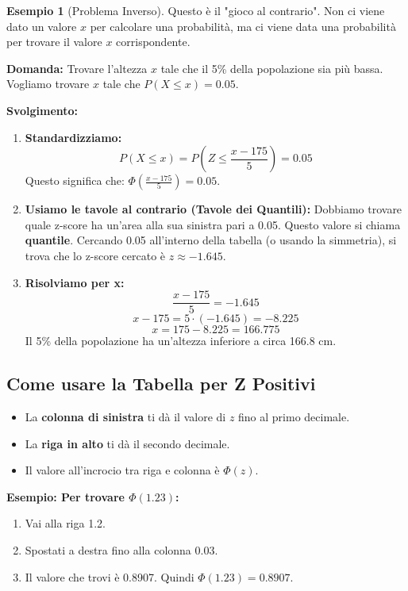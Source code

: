 \documentclass[a4paper, 11pt]{article}
\theoremstyle{definition}
\newtheorem{esempio}{Esempio}[section]
\begin{document}
\begin{esempio}[Problema Inverso]
Questo è il "gioco al contrario". Non ci viene dato un valore $x$ per calcolare una probabilità, ma ci viene data una probabilità per trovare il valore $x$ corrispondente.

\textbf{Domanda:} Trovare l'altezza $x$ tale che il 5\% della popolazione sia più bassa. Vogliamo trovare $x$ tale che $P(X \le x) = 0.05$.

\textbf{Svolgimento:}
\begin{enumerate}
    \item \textbf{Standardizziamo:}
    \[ P(X \le x) = P\left(Z \le \frac{x-175}{5}\right) = 0.05 \]
    Questo significa che: $\Phi\left(\frac{x-175}{5}\right) = 0.05$.

    \item \textbf{Usiamo le tavole al contrario (Tavole dei Quantili):}
    Dobbiamo trovare quale z-score ha un'area alla sua sinistra pari a 0.05. Questo valore si chiama \textbf{quantile}. Cercando 0.05 all'interno della tabella (o usando la simmetria), si trova che lo z-score cercato è $z \approx -1.645$.

    \item \textbf{Risolviamo per x:}
    \[ \frac{x-175}{5} = -1.645 \]
    \[ x - 175 = 5 \cdot (-1.645) = -8.225 \]
    \[ x = 175 - 8.225 = 166.775 \]
    Il 5\% della popolazione ha un'altezza inferiore a circa 166.8 cm.
\end{enumerate}
\end{esempio}

\newpage

\subsection*{Come usare la Tabella per Z Positivi}
\begin{itemize}
    \item La \textbf{colonna di sinistra} ti dà il valore di $z$ fino al primo decimale.
    \item La \textbf{riga in alto} ti dà il secondo decimale.
    \item Il valore all'incrocio tra riga e colonna è $\Phi(z)$.
\end{itemize}
\textbf{Esempio: Per trovare $\Phi(1.23)$:}
\begin{enumerate}
    \item Vai alla riga 1.2.
    \item Spostati a destra fino alla colonna 0.03.
    \item Il valore che trovi è 0.8907. Quindi $\Phi(1.23) = 0.8907$.
\end{enumerate}
\end{document}
